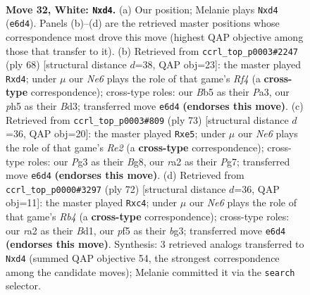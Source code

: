 \documentclass[11pt]{article}
\begin{document}
\clearpage

\begin{figure}[p]\centering
\begin{subfigure}{0.46\textwidth}\centering
\resizebox{\linewidth}{!}{%
\newchessgame
\chessboard[
  setfen={rn6/8/4N2k/1B3p1p/3p4/pP3KP1/r7/1R6 w - - 0 32},
  showmover=false,
  pgfstyle=straightmove, color=movearrow, markmove={e6-d4}
]}
\caption{}
\end{subfigure}\hfill
\begin{subfigure}{0.46\textwidth}\centering
\resizebox{\linewidth}{!}{%
\newchessgame
\chessboard[
  setfen={r7/4k3/1p2b2p/p3r2P/3p1R2/P2B4/3K3R/8 w - - 0 35},
  showmover=false,
  pgfstyle=straightmove, color=movearrow, markmove={f4-d4}
]}
\caption{}
\end{subfigure}
\\[4pt]
\begin{subfigure}{0.46\textwidth}\centering
\resizebox{\linewidth}{!}{%
\newchessgame
\chessboard[
  setfen={6bk/4r1p1/1N5p/4P3/5r2/P6P/3R2PK/1R6 b - - 0 37},
  showmover=false,
  pgfstyle=straightmove, color=movearrow, markmove={e7-e5}
]}
\caption{}
\end{subfigure}\hfill
\begin{subfigure}{0.46\textwidth}\centering
\resizebox{\linewidth}{!}{%
\newchessgame
\chessboard[
  setfen={6k1/5p2/p7/r4p2/PRp5/6b1/2P3P1/3B1K2 w - - 1 37},
  showmover=false,
  pgfstyle=straightmove, color=movearrow, markmove={b4-c4}
]}
\caption{}
\end{subfigure}
\caption{\textbf{Move 32, White: \texttt{Nxd4}.} (a) Our position; Melanie plays \texttt{Nxd4} (\texttt{e6d4}). Panels (b)--(d) are the retrieved master positions whose correspondence most drove this move (highest QAP objective among those that transfer to it). (b) Retrieved from \texttt{ccrl\_top\_p0003\#2247} (ply 68) [structural distance $d$=38, QAP obj=23]: the master played \texttt{Rxd4}; under $\mu$ our \emph{Ne6} plays the role of that game's \emph{Rf4} (a \textbf{cross-type} correspondence); cross-type roles: our \emph{B}b5 as their \emph{P}a3, our \emph{p}h5 as their \emph{B}d3; transferred move \texttt{e6d4} \textbf{(endorses this move)}. (c) Retrieved from \texttt{ccrl\_top\_p0003\#809} (ply 73) [structural distance $d$=36, QAP obj=20]: the master played \texttt{Rxe5}; under $\mu$ our \emph{Ne6} plays the role of that game's \emph{Re2} (a \textbf{cross-type} correspondence); cross-type roles: our \emph{P}g3 as their \emph{B}g8, our \emph{r}a2 as their \emph{P}g7; transferred move \texttt{e6d4} \textbf{(endorses this move)}. (d) Retrieved from \texttt{ccrl\_top\_p0000\#3297} (ply 72) [structural distance $d$=36, QAP obj=11]: the master played \texttt{Rxc4}; under $\mu$ our \emph{Ne6} plays the role of that game's \emph{Rb4} (a \textbf{cross-type} correspondence); cross-type roles: our \emph{r}a2 as their \emph{B}d1, our \emph{p}f5 as their \emph{b}g3; transferred move \texttt{e6d4} \textbf{(endorses this move)}. Synthesis: 3 retrieved analogs transferred to \texttt{Nxd4} (summed QAP objective 54, the strongest correspondence among the candidate moves); Melanie committed it via the \texttt{search} selector.}
\label{fig:thought-m62}
\end{figure}
\end{document}
